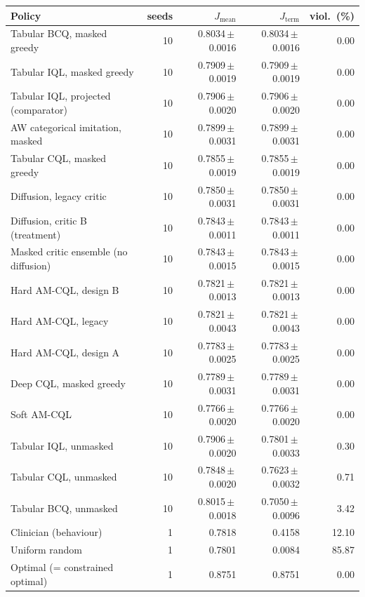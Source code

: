 \begin{tabular}{lrrrr}
\toprule
Policy & seeds & $J_{\mathrm{mean}}$ & $J_{\mathrm{term}}$ & viol.\ (\%) \\
\midrule
Tabular BCQ, masked greedy & 10 & 0.8034\,$\pm$\,0.0016 & 0.8034\,$\pm$\,0.0016 & 0.00 \\
Tabular IQL, masked greedy & 10 & 0.7909\,$\pm$\,0.0019 & 0.7909\,$\pm$\,0.0019 & 0.00 \\
Tabular IQL, projected (comparator) & 10 & 0.7906\,$\pm$\,0.0020 & 0.7906\,$\pm$\,0.0020 & 0.00 \\
AW categorical imitation, masked & 10 & 0.7899\,$\pm$\,0.0031 & 0.7899\,$\pm$\,0.0031 & 0.00 \\
Tabular CQL, masked greedy & 10 & 0.7855\,$\pm$\,0.0019 & 0.7855\,$\pm$\,0.0019 & 0.00 \\
Diffusion, legacy critic & 10 & 0.7850\,$\pm$\,0.0031 & 0.7850\,$\pm$\,0.0031 & 0.00 \\
Diffusion, critic B (treatment) & 10 & 0.7843\,$\pm$\,0.0011 & 0.7843\,$\pm$\,0.0011 & 0.00 \\
Masked critic ensemble (no diffusion) & 10 & 0.7843\,$\pm$\,0.0015 & 0.7843\,$\pm$\,0.0015 & 0.00 \\
Hard AM-CQL, design B & 10 & 0.7821\,$\pm$\,0.0013 & 0.7821\,$\pm$\,0.0013 & 0.00 \\
Hard AM-CQL, legacy & 10 & 0.7821\,$\pm$\,0.0043 & 0.7821\,$\pm$\,0.0043 & 0.00 \\
Hard AM-CQL, design A & 10 & 0.7783\,$\pm$\,0.0025 & 0.7783\,$\pm$\,0.0025 & 0.00 \\
Deep CQL, masked greedy & 10 & 0.7789\,$\pm$\,0.0031 & 0.7789\,$\pm$\,0.0031 & 0.00 \\
Soft AM-CQL & 10 & 0.7766\,$\pm$\,0.0020 & 0.7766\,$\pm$\,0.0020 & 0.00 \\
\midrule
Tabular IQL, unmasked & 10 & 0.7906\,$\pm$\,0.0020 & 0.7801\,$\pm$\,0.0033 & 0.30 \\
Tabular CQL, unmasked & 10 & 0.7848\,$\pm$\,0.0020 & 0.7623\,$\pm$\,0.0032 & 0.71 \\
Tabular BCQ, unmasked & 10 & 0.8015\,$\pm$\,0.0018 & 0.7050\,$\pm$\,0.0096 & 3.42 \\
\midrule
Clinician (behaviour) & 1 & 0.7818 & 0.4158 & 12.10 \\
Uniform random & 1 & 0.7801 & 0.0084 & 85.87 \\
Optimal (= constrained optimal) & 1 & 0.8751 & 0.8751 & 0.00 \\
\bottomrule
\end{tabular}
